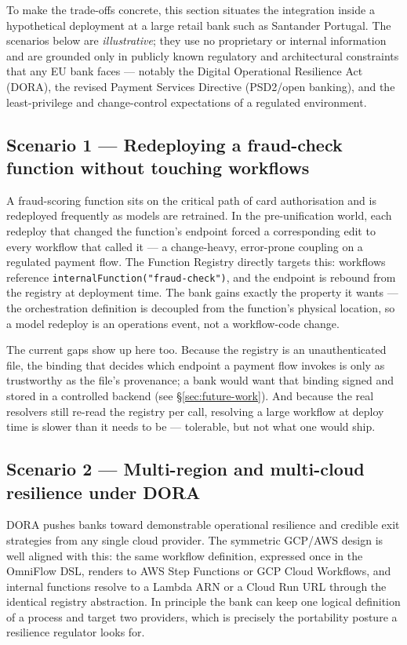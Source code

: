 To make the trade-offs concrete, this section situates the integration inside a hypothetical
deployment at a large retail bank such as Santander Portugal. The scenarios below are
\emph{illustrative}; they use no proprietary or internal information and are grounded only in
publicly known regulatory and architectural constraints that any EU bank faces --- notably the
Digital Operational Resilience Act (DORA), the revised Payment Services Directive (PSD2/open
banking), and the least-privilege and change-control expectations of a regulated environment.

\subsection{Scenario 1 --- Redeploying a fraud-check function without touching workflows}

A fraud-scoring function sits on the critical path of card authorisation and is redeployed
frequently as models are retrained. In the pre-unification world, each redeploy that changed the
function's endpoint forced a corresponding edit to every workflow that called it --- a
change-heavy, error-prone coupling on a regulated payment flow. The Function Registry directly
targets this: workflows reference \texttt{internalFunction("fraud-check")}, and the endpoint is
rebound from the registry at deployment time. The bank gains exactly the property it wants ---
the orchestration definition is decoupled from the function's physical location, so a model
redeploy is an operations event, not a workflow-code change.

The current gaps show up here too. Because the registry is an unauthenticated file, the binding
that decides which endpoint a payment flow invokes is only as trustworthy as the file's
provenance; a bank would want that binding signed and stored in a controlled backend (see
\S\ref{sec:future-work}). And because the real resolvers still re-read the registry per call,
resolving a large workflow at deploy time is slower than it needs to be --- tolerable, but not
what one would ship.

\subsection{Scenario 2 --- Multi-region and multi-cloud resilience under DORA}

DORA pushes banks toward demonstrable operational resilience and credible exit strategies from
any single cloud provider. The symmetric GCP/AWS design is well aligned with this: the same
workflow definition, expressed once in the OmniFlow DSL, renders to AWS Step Functions or GCP
Cloud Workflows, and internal functions resolve to a Lambda ARN or a Cloud Run URL through the
identical registry abstraction. In principle the bank can keep one logical definition of a
process and target two providers, which is precisely the portability posture a resilience
regulator looks for.

